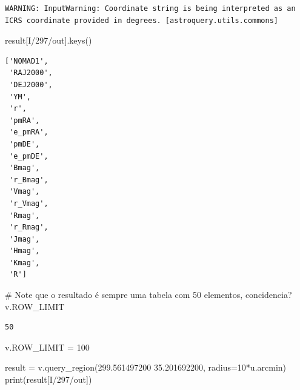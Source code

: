 \documentclass[
  letterpaper,
  DIV=11,
  numbers=noendperiod]{scrreprt}
\newenvironment{Shaded}{\begin{snugshade}}{\end{snugshade}}
\newcommand{\BuiltInTok}[1]{\textcolor[rgb]{0.00,0.23,0.31}{#1}}
\newcommand{\CommentTok}[1]{\textcolor[rgb]{0.37,0.37,0.37}{#1}}
\newcommand{\DecValTok}[1]{\textcolor[rgb]{0.68,0.00,0.00}{#1}}
\newcommand{\NormalTok}[1]{\textcolor[rgb]{0.00,0.23,0.31}{#1}}
\newcommand{\OperatorTok}[1]{\textcolor[rgb]{0.37,0.37,0.37}{#1}}
\newcommand{\StringTok}[1]{\textcolor[rgb]{0.13,0.47,0.30}{#1}}
\begin{document}
\begin{verbatim}
WARNING: InputWarning: Coordinate string is being interpreted as an ICRS coordinate provided in degrees. [astroquery.utils.commons]
\end{verbatim}

\begin{Shaded}
\begin{Highlighting}[]
\NormalTok{result[}\StringTok{\textquotesingle{}I/297/out\textquotesingle{}}\NormalTok{].keys()}
\end{Highlighting}
\end{Shaded}

\begin{verbatim}
['NOMAD1',
 'RAJ2000',
 'DEJ2000',
 'YM',
 'r',
 'pmRA',
 'e_pmRA',
 'pmDE',
 'e_pmDE',
 'Bmag',
 'r_Bmag',
 'Vmag',
 'r_Vmag',
 'Rmag',
 'r_Rmag',
 'Jmag',
 'Hmag',
 'Kmag',
 'R']
\end{verbatim}

\begin{Shaded}
\begin{Highlighting}[]
\CommentTok{\# Note que o resultado é sempre uma tabela com 50 elementos, concidencia?}
\NormalTok{v.ROW\_LIMIT}
\end{Highlighting}
\end{Shaded}

\begin{verbatim}
50
\end{verbatim}

\begin{Shaded}
\begin{Highlighting}[]
\NormalTok{v.ROW\_LIMIT }\OperatorTok{=} \DecValTok{100}
\end{Highlighting}
\end{Shaded}

\begin{Shaded}
\begin{Highlighting}[]
\NormalTok{result }\OperatorTok{=}\NormalTok{ v.query\_region(}\StringTok{\textquotesingle{}299.561497200  35.201692200\textquotesingle{}}\NormalTok{, radius}\OperatorTok{=}\DecValTok{10}\OperatorTok{*}\NormalTok{u.arcmin)}
\BuiltInTok{print}\NormalTok{(result[}\StringTok{\textquotesingle{}I/297/out\textquotesingle{}}\NormalTok{])}
\end{Highlighting}
\end{Shaded}
\end{document}
